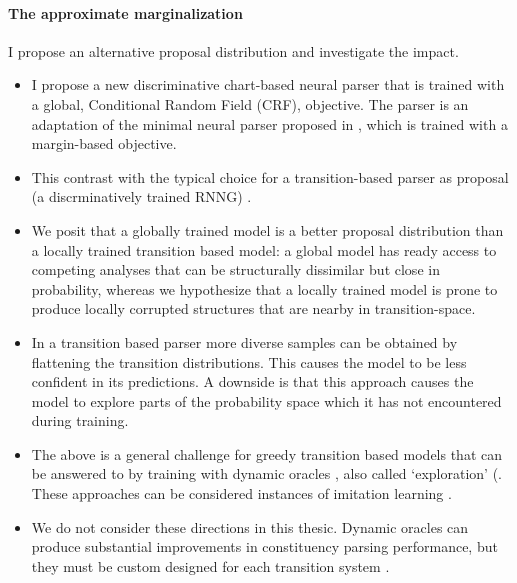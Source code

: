 \paragraph{The approximate marginalization} I propose an alternative proposal distribution and investigate the impact.
\begin{itemize}
  \item I propose a new discriminative chart-based neural parser that is trained with a global, Conditional Random Field (CRF), objective. The parser is an adaptation of the minimal neural parser proposed in \citet{Stern+2017:Minimal}, which is trained with a margin-based objective.
  \item This contrast with the typical choice for a transition-based parser as proposal (a discrminatively trained RNNG) \citep{Dyer+2016:RNNG}.
  \item We posit that a globally trained model is a better proposal distribution than a locally trained transition based model: a global model has ready access to competing analyses that can be structurally dissimilar but close in probability, whereas we hypothesize that a locally trained model is prone to produce locally corrupted structures that are nearby in transition-space.
  \item In a transition based parser more diverse samples can be obtained by flattening the transition distributions. This causes the model to be less confident in its predictions. A downside is that this approach causes the model to explore parts of the probability space which it has not encountered during training.
  \item The above is a general challenge for greedy transition based models that can be answered to by training with dynamic oracles \citep{Goldberg+2013:dynamic}, also called `exploration' (\citep{Ballesteros+2016:exploration,Stern+2017:Minimal}. These approaches can be considered instances of imitation learning \citep{Vlachos,Eisner+2012:imitation}.
  \item We do not consider these directions in this thesic. Dynamic oracles can produce substantial improvements in constituency parsing performance, but they must be custom designed for each transition system \citep{Klein+2018:reinforce}.
\end{itemize}


